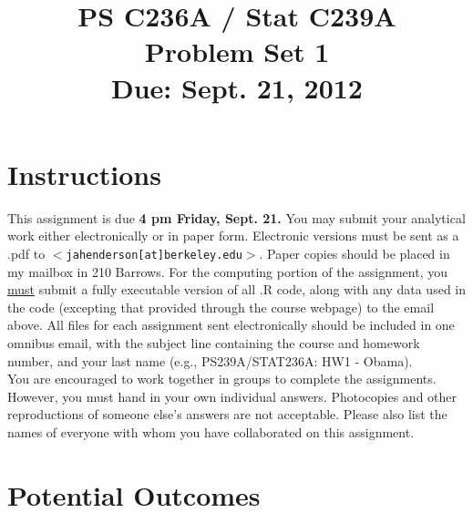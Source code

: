 \documentclass{article}
\title{PS C236A / Stat C239A \\ Problem Set 1 \\ Due: Sept. 21, 2012}
\date{}
\begin{document}
\maketitle
\vspace{-4em}
\section*{Instructions}
This assignment is due {\bf 4 pm Friday, Sept. 21.}  You may submit
your analytical work either electronically or in paper form.
Electronic versions must be sent as a .pdf to
$<$\texttt{jahenderson[at]berkeley.edu}$>$. Paper copies should be
placed in my mailbox in 210 Barrows.  For the computing portion of the
assignment, you \underline{must} submit a fully executable version of
all .R code, along with any data used in the code (excepting that
provided through the course webpage) to the email above.  All files
for each assignment sent electronically should be included in one
omnibus email, with the subject line containing the course and
homework number, and your last name (e.g., PS239A/STAT236A: HW1 - Obama).\\







\noindent You are encouraged to work together in groups to complete
the assignments. However, you must hand in your own individual
answers. Photocopies and other reproductions of someone else’s answers
are not acceptable. Please also list the names of everyone with
whom you have collaborated on this assignment.



\section*{Potential Outcomes}
\end{document}
